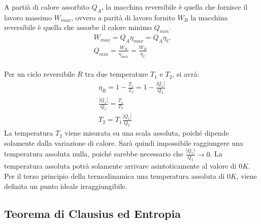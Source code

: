 \documentclass{article}
\numberwithin{equation}{subsection}
\begin{document}
A partià di calore assorbito $Q_A$, la macchina reversibile è quella che fornisce il lavoro massimo $W_{max}$, ovvero a parità di lavoro fornito $W_B$ la macchina reversibile è quella che assorbe 
il calore minimo $Q_{min}$. 
\begin{gather*}
    W_{max}=Q_A\eta_{max}=Q_A\eta_C\\
    Q_{min}=\displaystyle\frac{W_B}{\eta_{max}}=\frac{W_B}{\eta_C}
\end{gather*}
\\
Per un ciclo reversibile $R$ tra due temperature $T_1$ e $T_2$, si avrà:
\begin{gather*}
    \eta_R=1-\displaystyle\frac{T_1}{T_2}=1-\displaystyle\frac{|Q_1|}{Q_2}\\
    \displaystyle\frac{|Q_1|}{Q_2}=\frac{T_1}{T_2}\\
    T_2=T_1\displaystyle\frac{|Q_1|}{Q_2}
\end{gather*}
La temperatura $T_2$ viene misurata su una scala assoluta, poiché dipende solamente dalla variazione di calore. Sarà quindi impossibile raggiungere 
una temperatura assoluta nulla, poiché sarebbe 
necessario che $\displaystyle\frac{|Q_1|}{Q_2}\to 0$. La temperatura assoluta potrà solamente arrivare asintoticamente al valore di $0K$. 
Per il terzo principio della termodinamica una temperatura assoluta di $0K$, viene definita un punto ideale irraggiungibile. 

\subsection{Teorema di Clausius ed Entropia}
\end{document}
